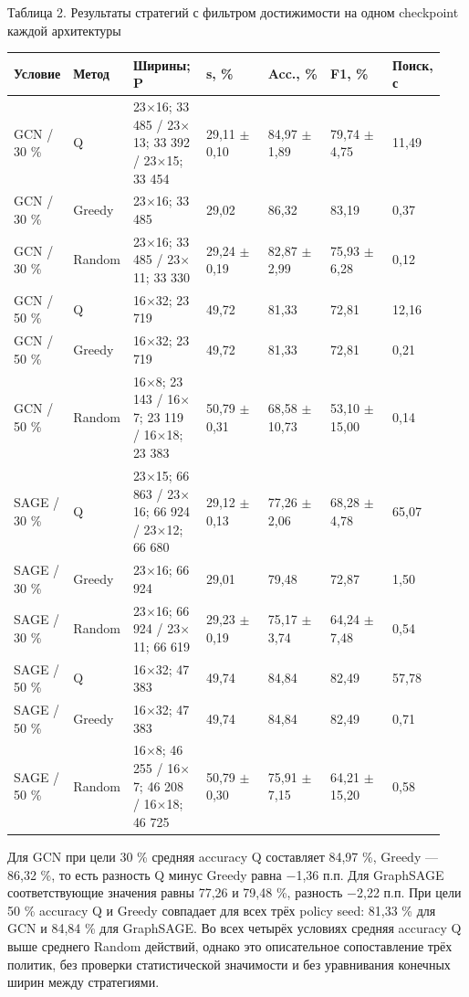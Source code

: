 \documentclass[10pt,a4paper]{article}
\begin{document}
\par\medskip\noindent Таблица 2. Результаты стратегий с фильтром достижимости на одном checkpoint каждой архитектуры\par
\begingroup\setlength{\tabcolsep}{2pt}\renewcommand{\arraystretch}{1.12}
\begin{longtable}{p{0.100\linewidth}p{0.091\linewidth}p{0.170\linewidth}p{0.159\linewidth}p{0.159\linewidth}p{0.159\linewidth}p{0.103\linewidth}}
\toprule
Условие & Метод & Ширины; P & s, \% & Acc., \% & F1, \% & Поиск, с\\ \midrule\endhead
GCN / 30 \% & Q & 23$\times$16; 33 485 / 23$\times$13; 33 392 / 23$\times$15; 33 454 & 29,11 $\pm$ 0,10 & 84,97 $\pm$ 1,89 & 79,74 $\pm$ 4,75 & 11,49\\
GCN / 30 \% & Greedy & 23$\times$16; 33 485 & 29,02 & 86,32 & 83,19 & 0,37\\
GCN / 30 \% & Random & 23$\times$16; 33 485 / 23$\times$11; 33 330 & 29,24 $\pm$ 0,19 & 82,87 $\pm$ 2,99 & 75,93 $\pm$ 6,28 & 0,12\\
GCN / 50 \% & Q & 16$\times$32; 23 719 & 49,72 & 81,33 & 72,81 & 12,16\\
GCN / 50 \% & Greedy & 16$\times$32; 23 719 & 49,72 & 81,33 & 72,81 & 0,21\\
GCN / 50 \% & Random & 16$\times$8; 23 143 / 16$\times$7; 23 119 / 16$\times$18; 23 383 & 50,79 $\pm$ 0,31 & 68,58 $\pm$ 10,73 & 53,10 $\pm$ 15,00 & 0,14\\
SAGE / 30 \% & Q & 23$\times$15; 66 863 / 23$\times$16; 66 924 / 23$\times$12; 66 680 & 29,12 $\pm$ 0,13 & 77,26 $\pm$ 2,06 & 68,28 $\pm$ 4,78 & 65,07\\
SAGE / 30 \% & Greedy & 23$\times$16; 66 924 & 29,01 & 79,48 & 72,87 & 1,50\\
SAGE / 30 \% & Random & 23$\times$16; 66 924 / 23$\times$11; 66 619 & 29,23 $\pm$ 0,19 & 75,17 $\pm$ 3,74 & 64,24 $\pm$ 7,48 & 0,54\\
SAGE / 50 \% & Q & 16$\times$32; 47 383 & 49,74 & 84,84 & 82,49 & 57,78\\
SAGE / 50 \% & Greedy & 16$\times$32; 47 383 & 49,74 & 84,84 & 82,49 & 0,71\\
SAGE / 50 \% & Random & 16$\times$8; 46 255 / 16$\times$7; 46 208 / 16$\times$18; 46 725 & 50,79 $\pm$ 0,30 & 75,91 $\pm$ 7,15 & 64,21 $\pm$ 15,20 & 0,58\\
\bottomrule\end{longtable}\endgroup
Для GCN при цели 30 \% средняя accuracy Q составляет 84,97 \%, Greedy — 86,32 \%, то есть разность Q минус Greedy равна $-$1,36 п.п. Для GraphSAGE соответствующие значения равны 77,26 и 79,48 \%, разность $-$2,22 п.п. При цели 50 \% accuracy Q и Greedy совпадает для всех трёх policy seed: 81,33 \% для GCN и 84,84 \% для GraphSAGE. Во всех четырёх условиях средняя accuracy Q выше среднего Random действий, однако это описательное сопоставление трёх политик, без проверки статистической значимости и без уравнивания конечных ширин между стратегиями.
\end{document}
